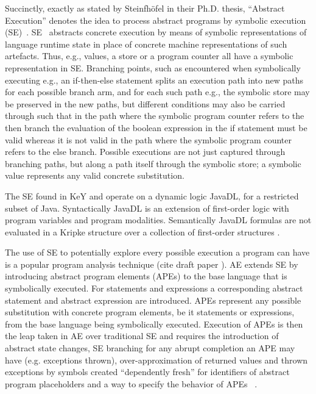 
Succinctly, exactly as stated by Steinfhöfel in their Ph.D. thesis, ``Abstract Execution'' denotes the idea to process abstract programs by symbolic execution (SE)~\cite{steinhoefel-20}.
SE~\cite{DBLP:journals/csur/BaldoniCDDF18,DBLP:journals/ac/YangFBCW19} abstracts concrete execution by means of symbolic representations of language runtime
state in place of concrete machine representations of such artefacts.
Thus, e.g., values, a store or a program counter all have a symbolic representation in SE.
Branching points, such as encountered when symbolically executing e.g., an if-then-else statement splits an execution path into new paths for each possible branch arm, and for each such
path e.g., the symbolic store may be preserved in the new paths, but different conditions may also be carried through such that in the path where the symbolic program counter refers
to the then branch the evaluation of the boolean expression in the if statement must be valid whereas it is not valid in the path where the symbolic program counter refers to the else branch.
Possible executions are not just captured through branching paths, but along a path itself through the symbolic store; a symbolic value represents any valid concrete substitution.

The SE found in KeY and \Refinity{} operate on a dynamic logic JavaDL, for a restricted subset of Java.
Syntactically JavaDL is an extension of first-order logic with program variables and program modalities.
Semantically JavaDL formulas are not evaluated in a Kripke structure
over a collection of first-order structures \cite{DBLP:series/lncs/10001}.

The use of SE to potentially explore every possible execution a program can have is a popular program analysis technique (cite draft paper \cite{xxx}). AE extends SE by
introducing abstract program elements (APEs) to the base language that is symbolically executed.
For statements and expressions a corresponding abstract statement and abstract expression are introduced.
APEs represent any possible substitution with concrete program elements, be it statements or expressions, from the base language being symbolically executed.
Execution of APEs is then the leap taken in AE over traditional SE and requires the introduction of abstract state changes, SE branching for
any abrupt completion an APE may have (e.g. exceptions thrown),
over-approximation of returned values and thrown exceptions by symbols created ``dependently fresh'' for identifiers of abstract program placeholders and a way to specify the behavior of APEs ~\cite{steinhoefel-20}.

